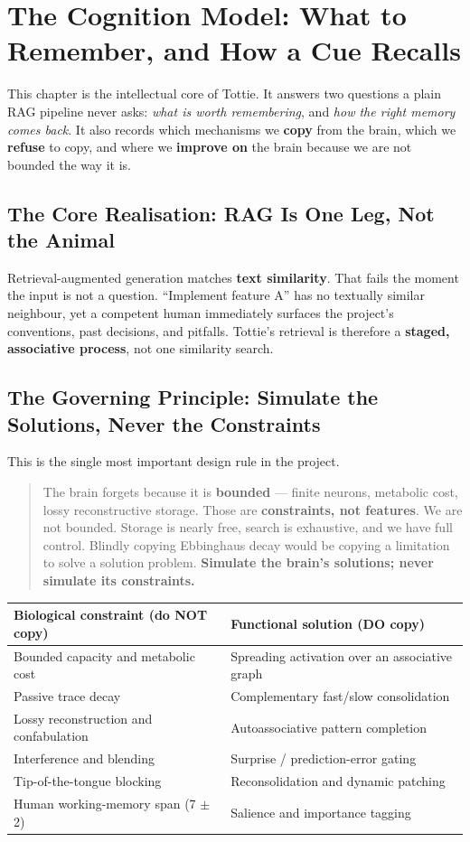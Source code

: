 \chapter{The Cognition Model: What to Remember, and How a Cue Recalls}

This chapter is the intellectual core of Tottie. It answers two questions a plain RAG pipeline never
asks: \emph{what is worth remembering}, and \emph{how the right memory comes back}. It also records
which mechanisms we \textbf{copy} from the brain, which we \textbf{refuse} to copy, and where we
\textbf{improve on} the brain because we are not bounded the way it is.

\section{The Core Realisation: RAG Is One Leg, Not the Animal}
Retrieval-augmented generation matches \textbf{text similarity}. That fails the moment the input is
not a question. ``Implement feature A'' has no textually similar neighbour, yet a competent human
immediately surfaces the project's conventions, past decisions, and pitfalls. Tottie's retrieval is
therefore a \textbf{staged, associative process}, not one similarity search.

\section{The Governing Principle: Simulate the Solutions, Never the Constraints}
This is the single most important design rule in the project.
\begin{quote}
The brain forgets because it is \textbf{bounded} --- finite neurons, metabolic cost, lossy
reconstructive storage. Those are \textbf{constraints, not features}. We are not bounded. Storage is
nearly free, search is exhaustive, and we have full control. Blindly copying Ebbinghaus decay would be
copying a limitation to solve a solution problem. \textbf{Simulate the brain's solutions; never
simulate its constraints.}
\end{quote}

\begin{longtable}{@{}p{}p{}@{}}
\toprule
Biological \textbf{constraint} (do NOT copy) & Functional \textbf{solution} (DO copy) \\
\midrule
Bounded capacity and metabolic cost & Spreading activation over an associative graph \\
Passive trace decay & Complementary fast/slow consolidation \\
Lossy reconstruction and confabulation & Autoassociative pattern completion \\
Interference and blending & Surprise / prediction-error gating \\
Tip-of-the-tongue blocking & Reconsolidation and dynamic patching \\
Human working-memory span (7 $\pm$ 2) & Salience and importance tagging \\
\bottomrule
\end{longtable}

